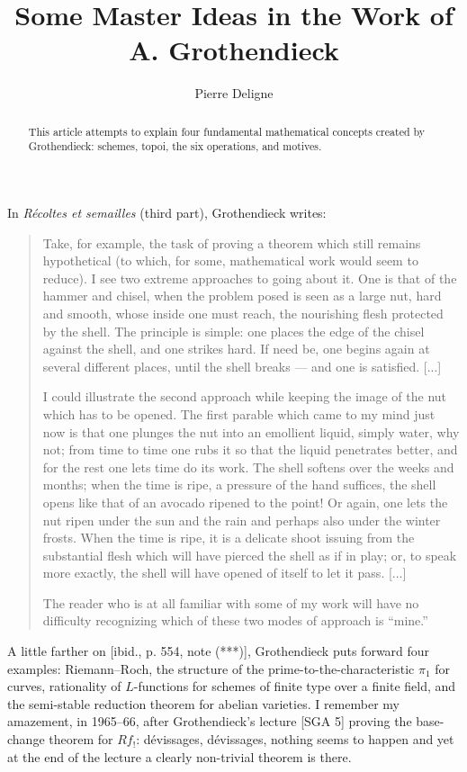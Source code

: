 \documentclass[11pt]{article}
\title{Some Master Ideas in the Work of A. Grothendieck}
\author{Pierre Deligne}
\date{}
\begin{document}
\maketitle

\begin{abstract}
This article attempts to explain four fundamental mathematical concepts created by Grothendieck: schemes, topoi, the six operations, and motives.
\end{abstract}

In \emph{Récoltes et semailles} (third part), Grothendieck writes:
\begin{quote}
Take, for example, the task of proving a theorem which still remains hypothetical (to which, for some, mathematical work would seem to reduce). I see two extreme approaches to going about it. One is that of the hammer and chisel, when the problem posed is seen as a large nut, hard and smooth, whose inside one must reach, the nourishing flesh protected by the shell. The principle is simple: one places the edge of the chisel against the shell, and one strikes hard. If need be, one begins again at several different places, until the shell breaks — and one is satisfied. [...]

I could illustrate the second approach while keeping the image of the nut which has to be opened. The first parable which came to my mind just now is that one plunges the nut into an emollient liquid, simply water, why not; from time to time one rubs it so that the liquid penetrates better, and for the rest one lets time do its work. The shell softens over the weeks and months; when the time is ripe, a pressure of the hand suffices, the shell opens like that of an avocado ripened to the point! Or again, one lets the nut ripen under the sun and the rain and perhaps also under the winter frosts. When the time is ripe, it is a delicate shoot issuing from the substantial flesh which will have pierced the shell as if in play; or, to speak more exactly, the shell will have opened of itself to let it pass. [...]

The reader who is at all familiar with some of my work will have no difficulty recognizing which of these two modes of approach is ``mine.''
\end{quote}

A little farther on [ibid., p. 554, note (***)], Grothendieck puts forward four examples: Riemann--Roch, the structure of the prime-to-the-characteristic \(\pi_1\) for curves, rationality of \(L\)-functions for schemes of finite type over a finite field, and the semi-stable reduction theorem for abelian varieties. I remember my amazement, in 1965--66, after Grothendieck's lecture [SGA 5] proving the base-change theorem for \(Rf_!\): dévissages, dévissages, nothing seems to happen and yet at the end of the lecture a clearly non-trivial theorem is there.
\end{document}
